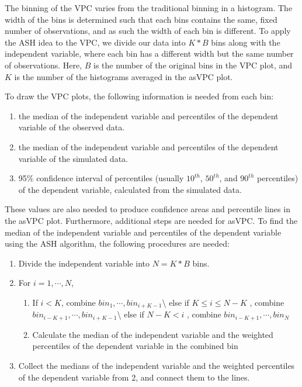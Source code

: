 The binning of the VPC varies from the traditional binning in a histogram. The width of the bins is determined such that each bins contains the same, fixed number of observations, and as such the width of each bin is different. To apply the ASH idea to the VPC, we divide our data into \(K*B\) bins along with the independent variable, where each bin has a different width but the same number of observations. Here, \(B\) is the number of the original bins in the VPC plot, and \(K\) is the number of the histograms averaged in the asVPC plot.

To draw the VPC plots, the following information is needed from each bin:

\begin{enumerate}
\def\labelenumi{(\Alph{enumi})}
\item
  the median of the independent variable and percentiles of the dependent variable of the observed data.
\item
  the median of the independent variable and percentiles of the dependent variable of the simulated data.
\item
  95\(\%\) confidence interval of percentiles (usually \(10^{th}\), \(50^{th}\), and \(90^{th}\) percentiles) of the dependent variable, calculated from the simulated data.
\end{enumerate}

These values are also needed to produce confidence areas and percentile lines in the asVPC plot. Furthermore, additional steps are needed for asVPC. To find the median of the independent variable and percentiles of the dependent variable using the ASH algorithm, the following procedures are needed:

\begin{enumerate}
\def\labelenumi{\arabic{enumi}.}
\item
  Divide the independent variable into \(N=K*B\) bins.
\item
  For \(i = 1, \cdots, N\),

  \begin{enumerate}
  \def\labelenumii{\alph{enumii})}
  \tightlist
  \item
    If \(i < K\), combine \(bin_1, \cdots, bin_{i+K-1}\)\textbackslash{}
    else if \(K\le i\le N-K\) , combine \(bin_{i-K+1}, \cdots, bin_{i+K-1}\)\textbackslash{}
    else if \(N-K < i\) , combine \(bin_{i-K+1}, \cdots, bin_N\)
  \item
    Calculate the median of the independent variable and the weighted percentiles of the dependent variable in the combined bin
  \end{enumerate}
\item
  Collect the medians of the independent variable and the weighted percentiles of the dependent variable from 2, and connect them to the lines.
\end{enumerate}

